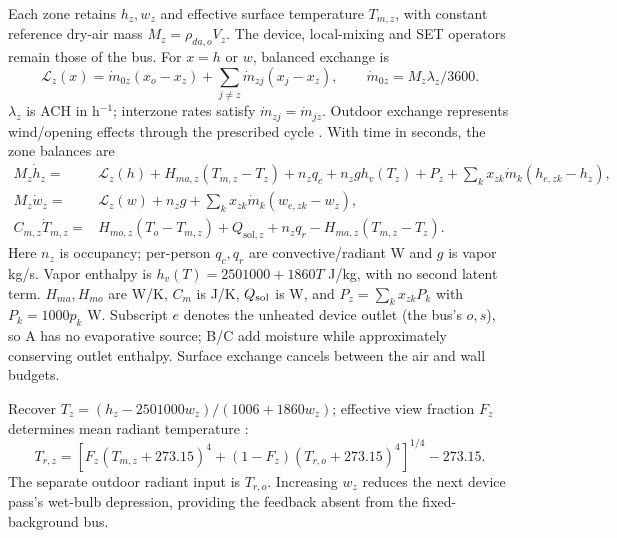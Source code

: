 Each zone retains $h_z,w_z$ and effective surface temperature $T_{m,z}$, with constant reference dry-air mass $M_z=\rho_{da,o}V_z$. The device, local-mixing and SET operators remain those of the bus. For $x=h$ or $w$, balanced exchange is
\begin{equation}
 \mathcal L_z(x)=\dot m_{0z}(x_o-x_z)+\sum_{j\ne z}\dot m_{zj}(x_j-x_z),
 \qquad \dot m_{0z}=M_z\lambda_z/3600.
\label{eq:rail-exchange}
\end{equation}
$\lambda_z$ is ACH in h$^{-1}$; interzone rates satisfy $\dot m_{zj}=\dot m_{jz}$. Outdoor exchange represents wind/opening effects through the prescribed cycle \cite{ventilation}. With time in seconds, the zone balances are~\cite{epzone}
\begin{align}
 M_z\dot h_z={}&\mathcal L_z(h)+H_{ma,z}(T_{m,z}-T_z)
 +n_zq_c+n_zg h_v(T_z)+P_z
 +\sum_k x_{zk}\dot m_k(h_{e,zk}-h_z),\label{eq:rail-enthalpy}\\
 M_z\dot w_z={}&\mathcal L_z(w)+n_zg+
 \sum_k x_{zk}\dot m_k(w_{e,zk}-w_z),\label{eq:rail-moisture}\\
 C_{m,z}\dot T_{m,z}={}&H_{mo,z}(T_o-T_{m,z})+Q_{\mathrm{sol},z}
 +n_zq_r-H_{ma,z}(T_{m,z}-T_z).\label{eq:rail-surface}
\end{align}
Here $n_z$ is occupancy; per-person $q_c,q_r$ are convective/radiant W and $g$ is vapor kg/s. Vapor enthalpy is $h_v(T)=2501000+1860T$ J/kg, with no second latent term. $H_{ma},H_{mo}$ are W/K, $C_m$ is J/K, $Q_{\rm sol}$ is W, and $P_z=\sum_kx_{zk}P_k$ with $P_k=1000p_k$ W. Subscript $e$ denotes the unheated device outlet (the bus's $o,s$), so A has no evaporative source; B/C add moisture while approximately conserving outlet enthalpy. Surface exchange cancels between the air and wall budgets.

Recover $T_z=(h_z-2501000w_z)/(1006+1860w_z)$; effective view fraction $F_z$ determines mean radiant temperature \cite{thermalcomfort}:
\begin{equation}
 T_{r,z}=\left[F_z(T_{m,z}+273.15)^4+(1-F_z)(T_{r,o}+273.15)^4\right]^{1/4}-273.15.
\label{eq:rail-mrt}
\end{equation}
The separate outdoor radiant input is $T_{r,o}$. Increasing $w_z$ reduces the next device pass's wet-bulb depression, providing the feedback absent from the fixed-background bus.

